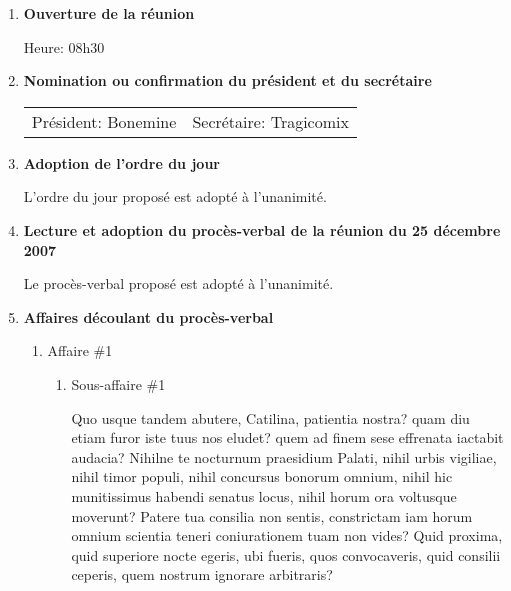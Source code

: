 \documentclass[12pt]{ULojpv}
\begin{document}
\entete
\begin{enumerate}
\item \textbf{Ouverture de la réunion}

Heure: 08h30


\item \textbf{Nomination ou confirmation du président et du secrétaire}

\begin{tabular}{@{}ll}
   Président: Bonemine
   & Secrétaire: Tragicomix
\end{tabular}


\item \textbf{Adoption de l'ordre du jour}

L'ordre du jour proposé est adopté à l'unanimité.


\item \textbf{Lecture et adoption du procès-verbal de la réunion du 25 décembre 2007}

Le procès-verbal proposé est adopté à l'unanimité.


\item \textbf{Affaires découlant du procès-verbal}

\begin{enumerate}

\item Affaire \#1

\begin{enumerate}

\item Sous-affaire \#1

Quo usque tandem abutere, Catilina, patientia nostra? quam diu etiam furor iste tuus nos eludet? quem ad finem sese effrenata iactabit audacia? Nihilne te nocturnum praesidium Palati, nihil urbis vigiliae, nihil timor populi, nihil concursus bonorum omnium, nihil hic munitissimus habendi senatus locus, nihil horum ora voltusque moverunt? Patere tua consilia non sentis, constrictam iam horum omnium scientia teneri coniurationem tuam non vides? Quid proxima, quid superiore nocte egeris, ubi fueris, quos convocaveris, quid consilii ceperis, quem nostrum ignorare arbitraris?


\end{enumerate}
\end{enumerate}
\end{enumerate}
\end{document}
